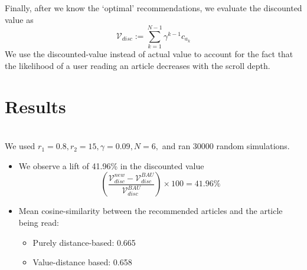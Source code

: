 \documentclass[11]{article}
\begin{document}
Finally, after we know the `optimal' recommendations, we evaluate the discounted value as \[\mathcal{V}_{disc}:=\sum_{k=1}^{N-1}  \gamma^{k-1} c_{a_k} \]
We use the discounted-value instead of actual value to account for the fact that the likelihood of a user reading an article decreases with the scroll depth.

\section{Results}

\\
We used $r_1=0.8, r_2=15, \gamma=0.09, N=6,$ and ran 30000 random simulations.
\begin{itemize}
\item We observe a lift of 41.96\% in the discounted value
\[ \left( \dfrac{  \mathcal{V}^{new}_{disc}-\mathcal{V}^{BAU}_{disc}  }{\mathcal{V}^{BAU}_{disc} } \right) \times 100  =41.96\% \]

\item Mean cosine-similarity between the recommended articles and the article being read:
\begin{itemize}
\item Purely distance-based: 0.665
\item Value-distance based: 0.658
\end{itemize}
\end{itemize}
\end{document}
